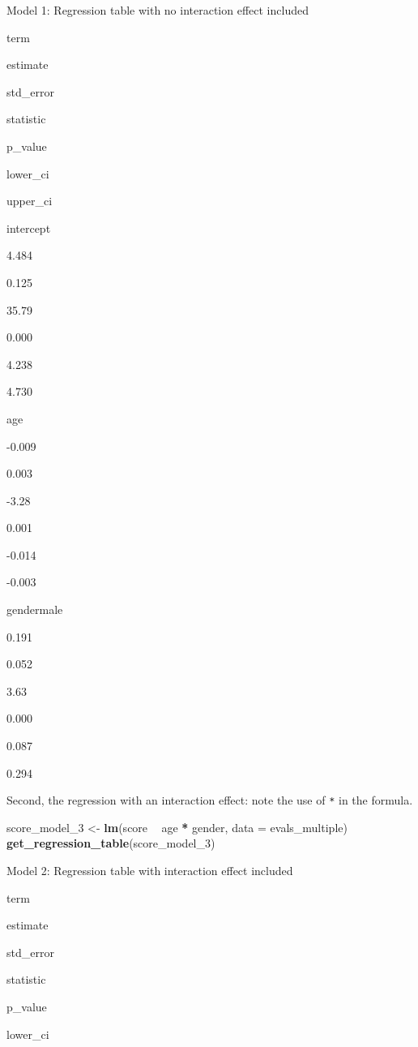 \documentclass[12pt,]{krantz}
\makeatletter
\newenvironment{Shaded}{\begin{snugshade}}{\end{snugshade}}
\newcommand{\KeywordTok}[1]{\textcolor[rgb]{0.27,0.27,0.27}{\textbf{#1}}}
\newcommand{\DataTypeTok}[1]{\textcolor[rgb]{0.27,0.27,0.27}{#1}}
\newcommand{\DecValTok}[1]{\textcolor[rgb]{0.06,0.06,0.06}{#1}}
\newcommand{\StringTok}[1]{\textcolor[rgb]{0.5,0.5,0.5}{#1}}
\newcommand{\OperatorTok}[1]{\textcolor[rgb]{0.43,0.43,0.43}{\textbf{#1}}}
\newcommand{\NormalTok}[1]{#1}
\newenvironment{kframe}{%
\medskip{}
\setlength{\fboxsep}{.8em}
 \def\at@end@of@kframe{}%
 \ifinner\ifhmode%
  \def\at@end@of@kframe{\end{minipage}}%
  \begin{minipage}{\columnwidth}%
 \fi\fi%
 \def\FrameCommand##1{\hskip\@totalleftmargin \hskip-\fboxsep
 \colorbox{shadecolor}{##1}\hskip-\fboxsep
     \hskip-\linewidth \hskip-\@totalleftmargin \hskip\columnwidth}%
 \MakeFramed {\advance\hsize-\width
   \@totalleftmargin\z@ \linewidth\hsize
   \@setminipage}}%
 {\par\unskip\endMakeFramed%
 \at@end@of@kframe}
\renewenvironment{Shaded}{\begin{kframe}}{\end{kframe}}
\makeatother
\begin{document}
\label{tab:modelmultireg}Model 1: Regression table with no interaction
effect included

term

estimate

std\_error

statistic

p\_value

lower\_ci

upper\_ci

intercept

4.484

0.125

35.79

0.000

4.238

4.730

age

-0.009

0.003

-3.28

0.001

-0.014

-0.003

gendermale

0.191

0.052

3.63

0.000

0.087

0.294

Second, the regression with an interaction effect: note the use of
\texttt{*} in the formula.

\begin{Shaded}
\begin{Highlighting}[]
\NormalTok{score_model_}\DecValTok{3}\NormalTok{ <-}\StringTok{ }\KeywordTok{lm}\NormalTok{(score }\OperatorTok{~}\StringTok{ }\NormalTok{age }\OperatorTok{*}\StringTok{ }\NormalTok{gender, }\DataTypeTok{data =}\NormalTok{ evals_multiple)}
\KeywordTok{get_regression_table}\NormalTok{(score_model_}\DecValTok{3}\NormalTok{)}
\end{Highlighting}
\end{Shaded}

\label{tab:unnamed-chunk-439}Model 2: Regression table with interaction
effect included

term

estimate

std\_error

statistic

p\_value

lower\_ci
\end{document}
